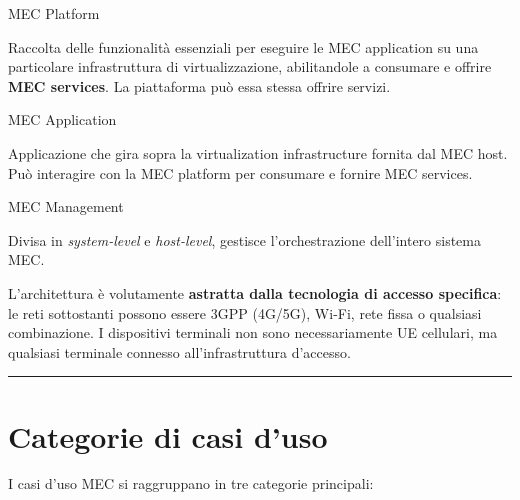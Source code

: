 \documentclass[
  italian,
  openany]{book}
\begin{document}
\begin{calloutdefinition}{MEC Platform}

Raccolta delle funzionalità essenziali per eseguire le MEC application
su una particolare infrastruttura di virtualizzazione, abilitandole a
consumare e offrire \textbf{MEC services}. La piattaforma può essa
stessa offrire servizi.

\end{calloutdefinition}

\begin{calloutdefinition}{MEC Application}

Applicazione che gira sopra la virtualization infrastructure fornita dal
MEC host. Può interagire con la MEC platform per consumare e fornire MEC
services.

\end{calloutdefinition}

\begin{calloutdefinition}{MEC Management}

Divisa in \emph{system-level} e \emph{host-level}, gestisce
l'orchestrazione dell'intero sistema MEC.

\end{calloutdefinition}

L'architettura è volutamente \textbf{astratta dalla tecnologia di
accesso specifica}: le reti sottostanti possono essere 3GPP (4G/5G),
Wi-Fi, rete fissa o qualsiasi combinazione. I dispositivi terminali non
sono necessariamente UE cellulari, ma qualsiasi terminale connesso
all'infrastruttura d'accesso.

\begin{center}\rule{0.5\linewidth}{0.5pt}\end{center}

\section{Categorie di casi d'uso}\label{categorie-di-casi-duso}

I casi d'uso MEC si raggruppano in tre categorie principali:
\end{document}
